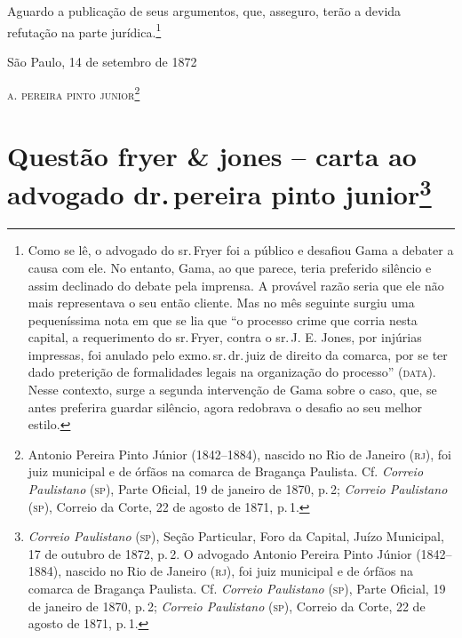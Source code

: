 Aguardo a publicação de seus argumentos, que, asseguro, terão a devida
refutação na parte jurídica.\footnote{ Como se lê, o advogado do sr.\,Fryer foi a público e desafiou Gama a debater a causa com ele. No
  entanto, Gama, ao que parece, teria preferido silêncio e assim
  declinado do debate pela imprensa. A provável razão seria que ele não
  mais representava o seu então cliente. Mas no mês seguinte surgiu uma
  pequeníssima nota em que se lia que ``o processo crime que corria nesta
  capital, a requerimento do sr.\,Fryer, contra o sr.\,J. E. Jones, por
  injúrias impressas, foi anulado pelo exmo.\,sr.\,dr.\,juiz de direito da
  comarca, por se ter dado preterição de formalidades legais na
  organização do processo'' (\textsc{data}). Nesse contexto, surge a segunda
  intervenção de Gama sobre o caso, que, se antes preferira guardar
  silêncio, agora redobrava o desafio ao seu melhor estilo.}

\begin{flushright}
São Paulo, 14 de setembro de 1872

\textsc{a. pereira pinto junior}\footnote{ Antonio Pereira Pinto Júnior
  (1842--1884), nascido no Rio de Janeiro (\textsc{rj}), foi juiz municipal e de
  órfãos na comarca de Bragança Paulista. Cf. \emph{Correio Paulistano}
  (\textsc{sp}), Parte Oficial, 19 de janeiro de 1870, p.\,2; \emph{Correio Paulistano} (\textsc{sp}),
  Correio da Corte, 22 de agosto de 1871, p.\,1.}
\end{flushright}

\chapter{Questão fryer \& jones -- carta ao advogado dr.\,pereira pinto junior\footnote{\emph{Correio Paulistano} (\textsc{sp}), Seção Particular, Foro
  da Capital, Juízo Municipal, 17 de outubro de 1872, p.\,2. O advogado Antonio
  Pereira Pinto Júnior (1842--1884), nascido no Rio de Janeiro (\textsc{rj}), foi
  juiz municipal e de órfãos na comarca de Bragança Paulista. Cf.
  \emph{Correio Paulistano} (\textsc{sp}), Parte Oficial, 19 de janeiro de 1870, p.\,2;
  \emph{Correio Paulistano} (\textsc{sp}), Correio da Corte, 22 de agosto de 1871, p.\,1.}} %

